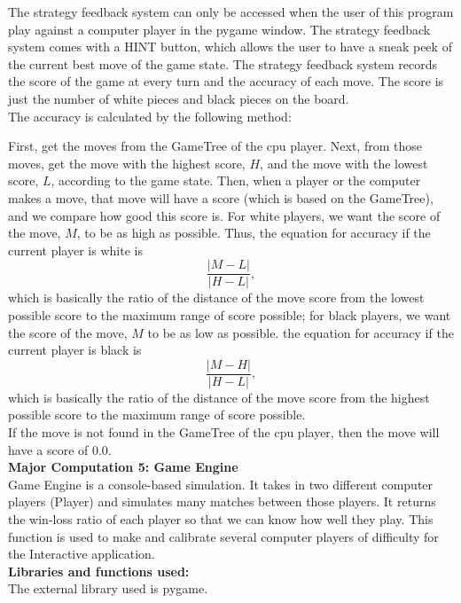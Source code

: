 \documentclass[fontsize=11pt]{article}
\begin{document}
The strategy feedback system can only be accessed when the user of this program play against a computer player in the pygame window. The strategy feedback system comes with a HINT button, which allows the user to have a sneak peek of the current best move of the game state. The strategy feedback system records the score of the game at every turn and the accuracy of each move. The score is just the number of white pieces and black pieces on the board. \\

The accuracy is calculated by the following method:

First, get the moves from the GameTree of the cpu player. Next, from those moves, get the move with the highest score, $H$, and the move with the lowest score, $L$, according to the game state. Then, when a player or the computer makes a move, that move will have a score (which is based on the GameTree), and we compare how good this score is. For white players, we want the score of the move, $M$, to be as high as possible. Thus, the equation for accuracy if the current player is white is $$ \dfrac{|M - L|}{|H - L|},$$ which is basically the ratio of the distance of the move score from the lowest possible score to the maximum range of score possible; for black players, we want the score of the move, $M$ to be as low as possible. the equation for accuracy if the current player is black is $$ \dfrac{|M - H|}{|H - L|},$$  which is basically the ratio of the distance of the move score from the highest possible score to the maximum range of score possible.\\

If the move is not found in the GameTree of the cpu player, then the move will have a score of 0.0.\\

\textbf{Major Computation 5: Game Engine}\\

Game Engine is a console-based simulation. It takes in two different computer players (Player) and simulates many matches between those players. It returns the win-loss ratio of each player so that we can know how well they play. This function is used to make and calibrate several computer players of difficulty for the Interactive application.\\


\textbf{Libraries and functions used:}\\


The external library used is pygame. \\
\end{document}
